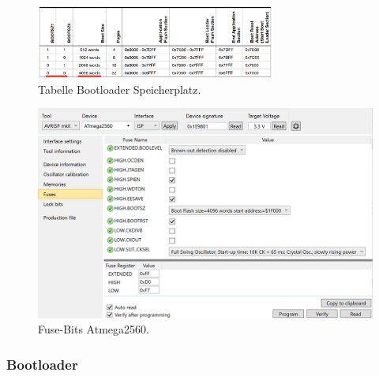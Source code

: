 

\begin{figure}[H]
	\centering
	\includegraphics[width=0.7\textwidth]{graphics/Tabelle_Bootloader}
	\caption{Tabelle Bootloader Speicherplatz.}
	\label{fig:Tabelle_Bootloader}
\end{figure}


\begin{figure}[H]
	\centering
	\includegraphics[width=\textwidth]{graphics/AtmelStudio_Fuses}
	\caption{Fuse-Bits Atmega2560.}
	\label{fig:AtmelStudio_Fuses}
\end{figure}

\subsubsection{Bootloader}\label{Appendix:Inbetriebnahme_Bootloader}

